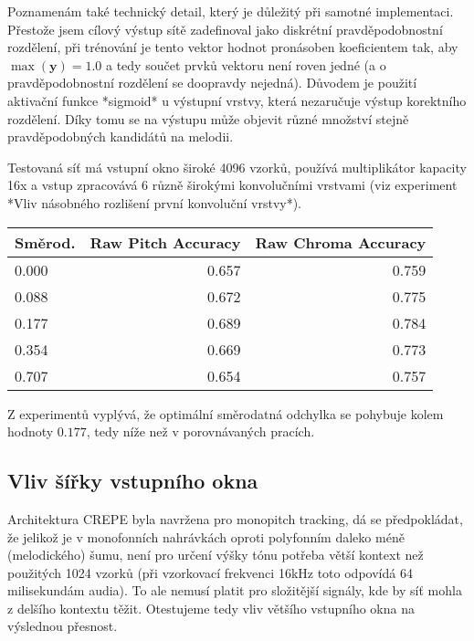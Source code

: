 Poznamenám také technický detail, který je důležitý při samotné implementaci. Přestože jsem cílový výstup sítě zadefinoval jako diskrétní pravděpodobnostní rozdělení, při trénování je tento vektor hodnot pronásoben koeficientem tak, aby $\max(\mathbf{y}) = 1.0$ a tedy součet prvků vektoru není roven jedné (a o pravděpodobnostní rozdělení se doopravdy nejedná). Důvodem je použití aktivační funkce *sigmoid* u výstupní vrstvy, která nezaručuje výstup korektního rozdělení. Díky tomu se na výstupu může objevit různé množství stejně pravděpodobných kandidátů na melodii.

Testovaná síť má vstupní okno široké 4096 vzorků, používá multiplikátor kapacity 16x a vstup zpracovává 6 různě širokými konvolučními vrstvami (viz experiment *Vliv násobného rozlišení první konvoluční vrstvy*).

    \begin{tabular}{lrr}
    \toprule
    Směrod. &  Raw Pitch Accuracy &  Raw Chroma Accuracy \\
    \midrule
    0.000   &               0.657 &                0.759 \\
    0.088   &               0.672 &                0.775 \\
    0.177   &               0.689 &                0.784 \\
    0.354   &               0.669 &                0.773 \\
    0.707   &               0.654 &                0.757 \\
    \bottomrule
    \end{tabular}

Z experimentů vyplývá, že optimální směrodatná odchylka se pohybuje kolem hodnoty $0.177$, tedy níže než v porovnávaných pracích. 


\subsection{Vliv šířky vstupního okna}

Architektura CREPE byla navržena pro monopitch tracking, dá se předpokládat, že jelikož je v monofonních nahrávkách oproti polyfonním daleko méně (melodického) šumu, není pro určení výšky tónu potřeba větší kontext než použitých 1024 vzorků (při vzorkovací frekvenci 16kHz toto odpovídá 64 milisekundám audia). To ale nemusí platit pro složitější signály, kde by síť mohla z delšího kontextu těžit. Otestujeme tedy vliv většího vstupního okna na výslednou přesnost.

